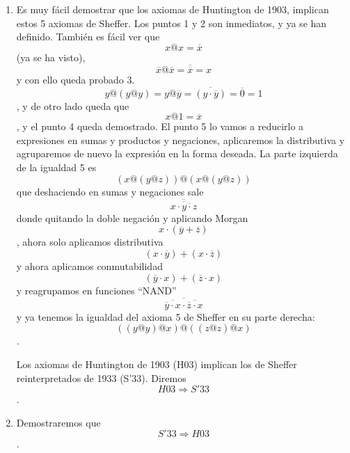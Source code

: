 \begin{enumerate}
\begin{enumerate}
\begin{enumerate}
\begin{enumerate}
        \begin{enumerate}
        \def\labelenumv{\arabic{enumv}.}
        \tightlist
        \item
          \[{\#\left( B \right)} \geq 2\]
        \item
          \[{{\cdot @} \cdot}:{{B \times B}\rightarrow B}\forall x,{y \in B}\exists!{z \in B}x@{y = z}\]
        \item
          \[\forall{x \in B}{({x@x})}@{{({x@x})} = x}\]
        \item
          \[\forall x,{y \in B}x@{{({y@{({y@y})}})} = x}@x\]
        \item
          \[\forall x,y,{z \in B}{({x@{({y@z})}})}@{{({x@{({y@z})}})} = {({{({y@y})}@x})}}@{({{({z@z})}@x})}\]
        \end{enumerate}
      \item
        Es muy fácil demostrar que los axiomas de Huntington de 1903,
        implican estos 5 axiomas de Sheffer. Los puntos 1 y 2 son
        inmediatos, y ya se han definido. También es fácil ver que
        \[x@{x = \overline{x}}\] (ya se ha visto),
        \[\overline{x}@{{\overline{x} = \overline{\overline{x}}} = x}\]y
        con ello queda probado
        3.\[y@{{({y@y})} = y}@{{{\overline{y} = \overline{({y\cdot\overline{y}})}} = \overline{0}} = 1}\],
        y de otro lado queda que \[x@{1 = \overline{x}}\], y el punto 4
        queda demostrado. El punto 5 lo vamos a reducirlo a expresiones
        en sumas y productos y negaciones, aplicaremos la distributiva y
        agruparemos de nuevo la expresión en la forma deseada. La parte
        izquierda de la igualdad 5 es
        \[{({x@{({y@z})}})}@{({x@{({y@z})}})}\]que deshaciendo en sumas
        y negaciones
        sale\[\overline{\overline{x\cdot\overline{y\cdot z}}}\]donde
        quitando la doble negación y aplicando
        Morgan\[x \cdot {({\overline{y} + \overline{z}})}\], ahora solo
        aplicamos
        distributiva\[{({x \cdot \overline{y}})} + {({x \cdot \overline{z}})}\]
        y ahora aplicamos
        conmutabilidad\[{({\overline{y} \cdot x})} + {({\overline{z} \cdot x})}\]y
        reagrupamos en funciones
        ``NAND''\[\overline{\overline{\overline{y}\cdot x}\cdot\overline{\overline{z}\cdot x}}\]y
        ya tenemos la igualdad del axioma 5 de Sheffer en su parte
        derecha:\[{({{({y@y})}@x})}@{({{({z@z})}@x})}\].

        Los axiomas de Huntington de 1903 (H03) implican los de Sheffer
        reinterpretados de 1933 (S'33). Diremos
        \[\mathit{H03}\Rightarrow S'33\].
      \item
        Demostraremos que \[S'33\Rightarrow\mathit{H03}\].


\end{enumerate}
\end{enumerate}
\end{enumerate}
\end{enumerate}
